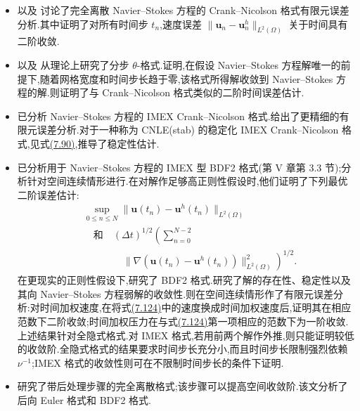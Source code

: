 \begin{note}\label{note:time-discretization-analysis}
\begin{itemize}
  \item \textcite{HeywoodRannacher1990}以及 \textcite{Bause1997}讨论了完全离散 Navier--Stokes 方程的 Crank--Nicolson 格式有限元误差分析.其中证明了对所有时间步 $t_n$,速度误差 $\|\bm{u}_n-\bm{u}_n^h\|_{L^2(\Omega)}$ 关于时间具有二阶收敛.
  \item \textcite{KloucekRys1994}以及 \textcite{MullerUrbaniak1993}从理论上研究了分步 $\theta$-格式.\textcite{KloucekRys1994}证明,在假设 Navier--Stokes 方程解唯一的前提下,随着网格宽度和时间步长趋于零,该格式所得解收敛到 Navier--Stokes 方程的解.\textcite{MullerUrbaniak1993}则证明了与 Crank--Nicolson 格式类似的二阶时间误差估计.
  \item \textcite{Baker1976}已分析 Navier--Stokes 方程的 IMEX Crank--Nicolson 格式.\textcite{Ingram2013b}给出了更精细的有限元误差分析.对于一种称为 CNLE(stab) 的稳定化 IMEX Crank--Nicolson 格式,见式\hyperref[eq:cnle-stabilized-convective-term]{(7.90)},\textcite{Ingram2013a}推导了稳定性估计.
  \item \textcite{GiraultRaviart1979}已分析用于 Navier--Stokes 方程的 IMEX 型 BDF2 格式(第 V 章第 3.3 节);分析针对空间连续情形进行.在对解作足够高正则性假设时,他们证明了下列最优二阶误差估计:
\begin{equation}\label{eq:imex-bdf2-optimal-error-estimates}
\begin{aligned}
&\sup_{0\le n\le N}
  \|\bm{u}(t_n)-\bm{u}^h(t_n)\|_{L^2(\Omega)}\\
&\quad\text{和}\quad(\Delta t)^{1/2}
  \left(\sum_{n=0}^{N-2}\right.\\
&\qquad\qquad\left.
  \|\nabla(\bm{u}(t_n)-\bm{u}^h(t_n))\|_{L^2(\Omega)}^2
  \right)^{1/2}.
\end{aligned}
\end{equation}
在更现实的正则性假设下,\textcite{Emmrich2004a,Emmrich2004b}研究了 BDF2 格式.\textcite{Emmrich2004b}研究了解的存在性、稳定性以及其向 Navier--Stokes 方程弱解的收敛性.\textcite{Emmrich2004a}则在空间连续情形作了有限元误差分析:对时间加权速度,在将式\hyperref[eq:imex-bdf2-optimal-error-estimates]{(7.124)}中的速度换成时间加权速度后,证明其在相应范数下二阶收敛;时间加权压力在与式\hyperref[eq:imex-bdf2-optimal-error-estimates]{(7.124)}第一项相应的范数下为一阶收敛.上述结果针对全隐式格式.对 IMEX 格式,若用前两个解作外推,则只能证明较低的收敛阶.全隐式格式的结果要求时间步长充分小,而且时间步长限制强烈依赖 $\nu^{-1}$;IMEX 格式的收敛性则可在不限制时间步长的条件下证明.
  \item \textcite{deFrutos2008}研究了带后处理步骤的完全离散格式;该步骤可以提高空间收敛阶.该文分析了后向 Euler 格式和 BDF2 格式.
\end{itemize}
\end{note}

